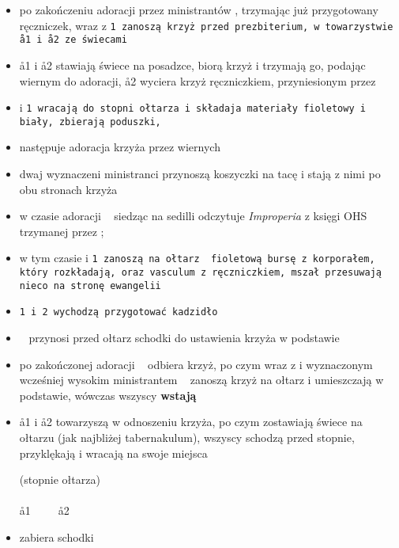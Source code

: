 \begin{itemize}
      \item po zakończeniu adoracji przez ministrantów , trzymając już
            przygotowany ręczniczek, wraz z \tt1 zanoszą krzyż przed
            prezbiterium, w towarzystwie \aa1 i \aa2 ze świecami
      \item \aa1 i \aa2 stawiają świece na posadzce, biorą krzyż i trzymają go,
            podając wiernym do adoracji, \aa2 wyciera krzyż ręczniczkiem,
            przyniesionym przez 
      \item {} i \tt1 wracają do stopni ołtarza i składaja materiały fioletowy
            i biały, zbierają poduszki,
      \item następuje adoracja krzyża przez wiernych
      \item dwaj wyznaczeni ministranci przynoszą koszyczki na tacę i stają z
            nimi po obu stronach krzyża
      \item w czasie adoracji \ii~ siedząc na sedilli odczytuje
            \textit{Improperia} z księgi OHS trzymanej przez \bb;
      \item w tym czasie  i \tt1 zanoszą na ołtarz {\color{violet}
            fioletową} bursę z korporałem, który rozkładają, oraz vasculum z
            ręczniczkiem, mszał przesuwają nieco na stronę ewangelii
      \item \tt1 i \tt2 wychodzą przygotować kadzidło
      \item \zz~ przynosi przed ołtarz schodki do ustawienia krzyża w podstawie
      \item po zakończonej adoracji \ii~ odbiera krzyż, po czym wraz z  i
            wyznaczonym wcześniej wysokim ministrantem \mm~ zanoszą krzyż na
            ołtarz i umieszczają w podstawie, wówczas wszyscy \textbf{wstają}
      \item \aa1 i \aa2 towarzyszą w odnoszeniu krzyża, po czym zostawiają
            świece na ołtarzu (jak najbliżej tabernakulum), wszyscy schodzą
            przed stopnie, przyklękają i wracają na swoje miejsca

            \begin{center}
                  (stopnie ołtarza) \smallskip\\
                  \mm~~\ii~~ \smallskip\\
                  \aa1~~~~~\aa2
            \end{center}

      \item {} zabiera schodki
\end{itemize}
